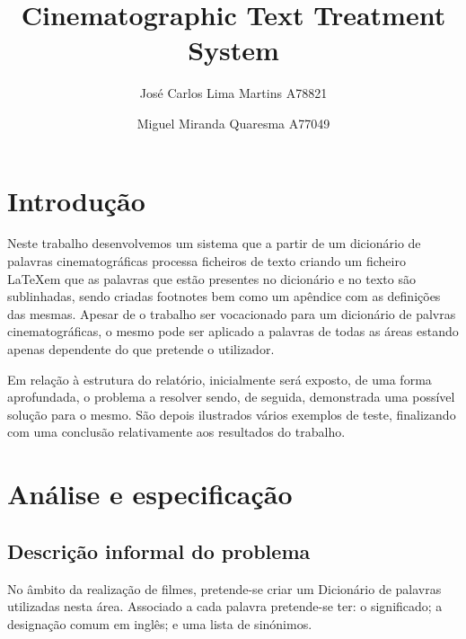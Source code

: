 \documentclass{llncs}
\begin{document}
 \mainmatter
\title{Cinematographic Text Treatment System}
\author{José Carlos Lima Martins A78821 \and
        Miguel Miranda Quaresma A77049}

\maketitle

\justify

\begin{abstract}

\end{abstract}

\section{Introdução}
Neste trabalho desenvolvemos um sistema que a partir de um dicionário de palavras cinematográficas processa ficheiros de texto criando um ficheiro \LaTeX em que as palavras que estão presentes no dicionário e no texto são sublinhadas, sendo criadas footnotes bem como um apêndice com as definições das mesmas. Apesar de o trabalho ser vocacionado para um dicionário de palvras cinematográficas, o mesmo pode ser aplicado a palavras de todas as áreas estando apenas dependente do que pretende o utilizador.

Em relação à estrutura do relatório, inicialmente será exposto, de uma forma aprofundada, o problema a resolver sendo, de seguida, demonstrada uma possível solução para o mesmo. São depois ilustrados vários exemplos de teste, finalizando com uma conclusão relativamente aos resultados do trabalho.

\section{Análise e especificação}

\subsection{Descrição informal do problema}
No âmbito da realização de filmes, pretende-se criar um Dicionário de palavras utilizadas nesta área. Associado a cada palavra pretende-se ter: o significado; a designação comum em inglês; e uma lista de sinónimos.
\end{document}
